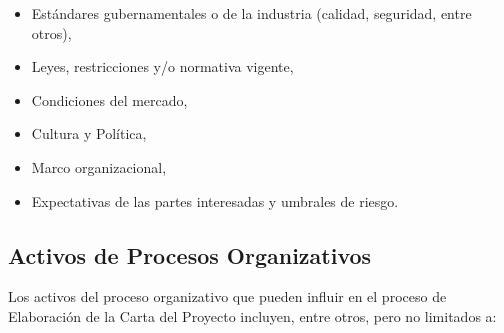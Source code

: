 \documentclass[letterpaper,12pt,openright,oneside]{article}
\theoremstyle{plain}
\begin{document}
\begin{itemize}
    \item Estándares gubernamentales o de la industria (calidad, seguridad, entre otros),
    \item Leyes, restricciones y/o normativa vigente,
    \item Condiciones del mercado,
    \item Cultura y Política,
    \item Marco organizacional,
    \item Expectativas de las partes interesadas y umbrales de riesgo.
\end{itemize}
% 
% 
\subsection*{Activos de Procesos Organizativos}

Los activos del proceso organizativo que pueden influir en el proceso de Elaboración de la Carta del Proyecto incluyen, entre otros, pero no limitados a:
\end{document}
